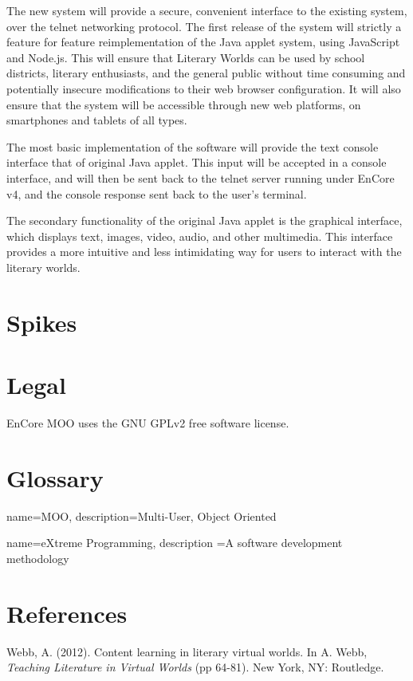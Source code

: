 \documentclass[12pt, letterpaper]{report}
\begin{document}
	\par
	The new system will provide a secure, convenient interface to the existing system, over the telnet networking protocol. The first release of the system will strictly a feature for feature reimplementation of the Java applet system, using JavaScript and Node.js. This will ensure that Literary Worlds can be used by school districts, literary enthusiasts, and the general public without time consuming and potentially insecure modifications to their web browser configuration. It will also ensure that the system will be accessible through new web platforms, on smartphones and tablets of all types.
	
		\par
	The most basic implementation of the software will provide the text console interface that of original Java applet. This input will be accepted in a console interface, and will then be sent back to the telnet server running under EnCore v4, and the console response sent back to the user's terminal.
	
	\par
	The secondary functionality of the original Java applet is the graphical interface, which displays text, images, video, audio, and other multimedia. This interface provides a more intuitive and less intimidating way for users to interact with the literary worlds.
	
	\chapter{Spikes}
	
	\chapter{Legal}
	\par
	EnCore MOO uses the GNU GPLv2 free software license.
	
	
	\usepackage{glossaries}
	\chapter{Glossary}

	{
		name=MOO,
  		description={Multi-User, Object Oriented}
	}
	
	{
		name=eXtreme Programming,
		description ={A software development methodology}
	}
	\makeglossaries
	
	
	\chapter{References}
	\begin{bibliography}{9}

 	Webb, A. (2012). Content learning in literary virtual worlds.
  	In A. Webb, \emph{Teaching Literature in Virtual Worlds} 
  	(pp 64-81).
  	New York, NY: Routledge.

	\end{bibliography}

	
	
\end{document}
